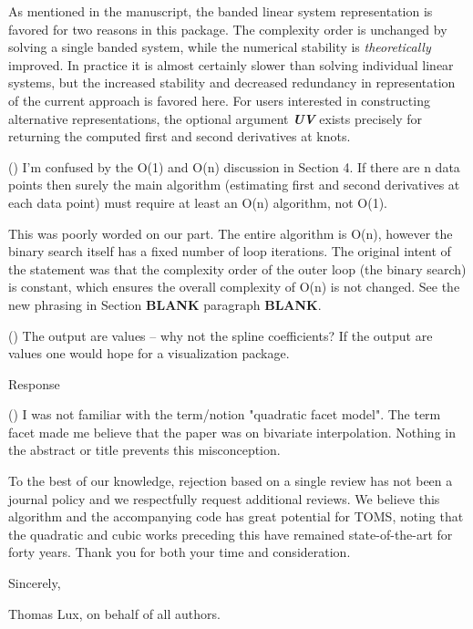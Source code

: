 As mentioned in the manuscript, the banded linear system representation is favored for two reasons in this package. The complexity order is unchanged by solving a single banded system, while the numerical stability is {\it theoretically} improved. In practice it is almost certainly slower than solving individual linear systems, but the increased stability and decreased redundancy in representation of the current approach is favored here. For users interested in constructing alternative representations, the optional argument {\it \bf UV} exists precisely for returning the computed first and second derivatives at knots.

{\parindent=20pt \it
  
\item{()} I'm confused by the O(1) and O(n) discussion in Section 4.
If there are n data points then surely the main algorithm (estimating first and second
derivatives at each data point) must require at least an O(n) algorithm, not O(1).

}

This was poorly worded on our part. The entire algorithm is O(n), however the binary search itself has a fixed number of loop iterations. The original intent of the statement was that the complexity order of the outer loop (the binary search) is constant, which ensures the overall complexity of O(n) is not changed. See the new phrasing in Section {\bf BLANK} paragraph {\bf BLANK}.

{\parindent=20pt \it
  
\item{()} The output are values -- why not the spline coefficients? If the output are values one would hope for a visualization package.

}

Response

{\parindent=20pt \it
  
\item{()} I was not familiar with the term/notion  "quadratic facet model". The term facet made me believe that the paper was on bivariate interpolation. Nothing in the abstract or title prevents this misconception.

}

\bigskip

To the best of our knowledge, rejection based on a single review has not been a journal policy and we respectfully request additional reviews. We believe this algorithm and the accompanying code has great potential for TOMS, noting that the quadratic and cubic works preceding this have remained state-of-the-art for forty years. Thank you for both your time and consideration.

Sincerely,

Thomas Lux, on behalf of all authors.

\bye



